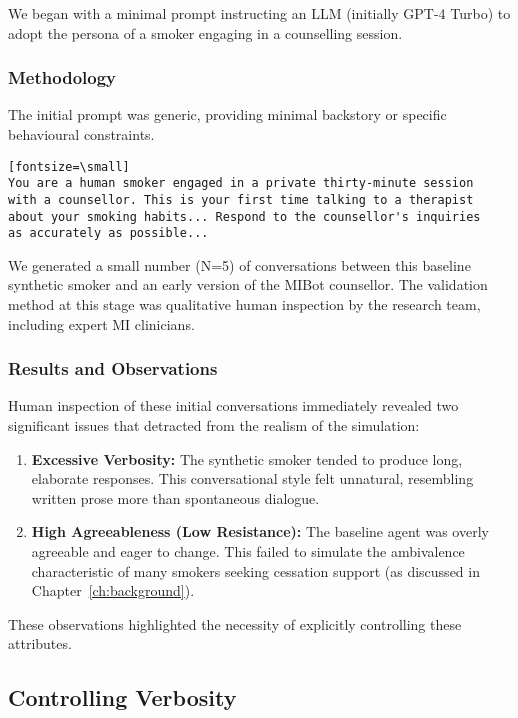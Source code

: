 We began with a minimal prompt instructing an LLM (initially GPT-4 Turbo) to adopt the persona of a smoker engaging in a counselling session.

\subsubsection{Methodology}
The initial prompt was generic, providing minimal backstory or specific behavioural constraints.
\begin{verbatim}[fontsize=\small]
You are a human smoker engaged in a private thirty-minute session
with a counsellor. This is your first time talking to a therapist
about your smoking habits... Respond to the counsellor's inquiries
as accurately as possible...
\end{verbatim}

We generated a small number (N=5) of conversations between this baseline synthetic smoker and an early version of the MIBot counsellor. The validation method at this stage was qualitative human inspection by the research team, including expert MI clinicians.

\subsubsection{Results and Observations}
Human inspection of these initial conversations immediately revealed two significant issues that detracted from the realism of the simulation:

\begin{enumerate}
    \item \textbf{Excessive Verbosity:} The synthetic smoker tended to produce long, elaborate responses. This conversational style felt unnatural, resembling written prose more than spontaneous dialogue.
    \item \textbf{High Agreeableness (Low Resistance):} The baseline agent was overly agreeable and eager to change. This failed to simulate the ambivalence characteristic of many smokers seeking cessation support (as discussed in Chapter~\ref{ch:background}).
\end{enumerate}

These observations highlighted the necessity of explicitly controlling these attributes.

\subsection{Controlling Verbosity}
\label{sec:synthetic-smoker-verbosity}


